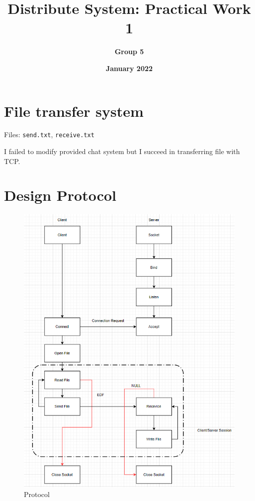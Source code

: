 \documentclass[12pt]{article}
\title{\textbf{Distribute System: Practical Work 1 }}
\author{\textbf{Group 5}}
\date{\textbf{January 2022}}
\begin{document}
\maketitle

\section{File transfer system}
\hspace{1.5cm}
 Files: \texttt{send.txt}, \texttt{receive.txt}
 
\vspace{0.5cm}
I failed to modify provided chat system but I succeed in transferring file with TCP.
\vspace{2cm}

\section{Design Protocol}
\begin{figure}
    \includegraphics{Image/lab1.png}
    \caption{Protocol}
    \label{fig:my_label}
\end{figure}
\end{document}
